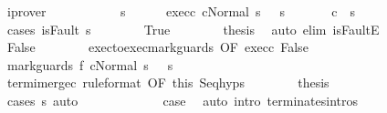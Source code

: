 \begin{isabellebody}
\ iprover\isanewline
\ \ \isamarkupfalse%
\isanewline
\ \ \isacommand{{\isacharbraceleft}}\isamarkupfalse%
\isanewline
\ \ \ \ \isamarkupfalse%
\ s{\isacharprime}\isanewline
\ \ \ \ \isamarkupfalse%
\ exec{\isacharunderscore}c{}{\isacharcolon}\ {\isachardoublequoteopen}{\isasymGamma}{\isasymturnstile}{\isasymlangle}c{}{\isacharcomma}Normal\ s\ {\isasymrangle}\ {\isasymRightarrow}\ s{\isacharprime}{\isachardoublequoteclose}\isanewline
\ \ \ \ \isamarkupfalse%
\ {\isachardoublequoteopen}{\isasymGamma}{\isasymturnstile}\ c{}\ {\isasymdown}\ s{\isacharprime}{\isachardoublequoteclose}\isanewline
\ \ \ \ \isamarkupfalse%
\ {\isacharparenleft}cases\ {\isachardoublequoteopen}isFault\ s{\isacharprime}{\isachardoublequoteclose}{\isacharparenright}\isanewline
\ \ \ \ \ \ \isamarkupfalse%
\ True\isanewline
\ \ \ \ \ \ \isamarkupfalse%
\ {\isacharquery}thesis\ \isamarkupfalse%
\ {\isacharparenleft}auto\ elim{\isacharcolon}\ isFaultE{\isacharparenright}\isanewline
\ \ \ \ \isamarkupfalse%
\isanewline
\ \ \ \ \ \ \isamarkupfalse%
\ False\isanewline
\ \ \ \ \ \ \isamarkupfalse%
\ exec{\isacharunderscore}to{\isacharunderscore}exec{\isacharunderscore}mark{\isacharunderscore}guards\ {\isacharbrackleft}OF\ exec{\isacharunderscore}c{}\ False{\isacharbrackright}\ \isanewline
\ \ \ \ \ \ \isamarkupfalse%
\ {\isachardoublequoteopen}{\isasymGamma}{\isasymturnstile}{\isasymlangle}mark{\isacharunderscore}guards\ f\ c{}{\isacharcomma}Normal\ s\ {\isasymrangle}\ {\isasymRightarrow}\ s{\isacharprime}{\isachardoublequoteclose}\ \isacommand{{\isachardot}}\isamarkupfalse%
\isanewline
\ \ \ \ \ \ \isamarkupfalse%
\ termi{\isacharunderscore}merge{\isacharunderscore}c{}\ {\isacharbrackleft}rule{\isacharunderscore}format{\isacharcomma}\ OF\ this{\isacharbrackright}\ Seq{\isachardot}hyps\isanewline
\ \ \ \ \ \ \isamarkupfalse%
\ {\isacharquery}thesis\isanewline
\ \ \ \ \ \ \ \ \isamarkupfalse%
\ {\isacharparenleft}cases\ s{\isacharprime}{\isacharparenright}\ {\isacharparenleft}auto{\isacharparenright}\isanewline
\ \ \ \ \isamarkupfalse%
\isanewline
\ \ \isacommand{{\isacharbraceright}}\isamarkupfalse%
\isanewline
\ \ \isamarkupfalse%
\ \isamarkupfalse%
\ {\isacharquery}case\ \isamarkupfalse%
\ {\isacharparenleft}auto\ intro{\isacharcolon}\ terminates{\isachardot}intros{\isacharparenright}\isanewline

\end{isabellebody}
